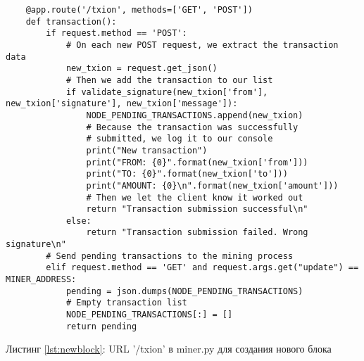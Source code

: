 \begin{center}
\begin{lstlisting}
    @app.route('/txion', methods=['GET', 'POST'])
    def transaction():
        if request.method == 'POST':
            # On each new POST request, we extract the transaction data
            new_txion = request.get_json()
            # Then we add the transaction to our list
            if validate_signature(new_txion['from'], new_txion['signature'], new_txion['message']):
                NODE_PENDING_TRANSACTIONS.append(new_txion)
                # Because the transaction was successfully
                # submitted, we log it to our console
                print("New transaction")
                print("FROM: {0}".format(new_txion['from']))
                print("TO: {0}".format(new_txion['to']))
                print("AMOUNT: {0}\n".format(new_txion['amount']))
                # Then we let the client know it worked out
                return "Transaction submission successful\n"
            else:
                return "Transaction submission failed. Wrong signature\n"
        # Send pending transactions to the mining process
        elif request.method == 'GET' and request.args.get("update") == MINER_ADDRESS:
            pending = json.dumps(NODE_PENDING_TRANSACTIONS)
            # Empty transaction list
            NODE_PENDING_TRANSACTIONS[:] = []
            return pending
\end{lstlisting}\label{lst:newblock}
    Листинг \ref{lst:newblock}: URL '/txion' в {\small miner.py} для создания нового блока
\end{center}


